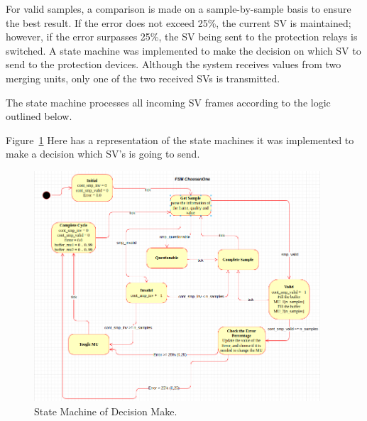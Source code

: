 For valid samples, a comparison is made on a sample-by-sample basis to ensure the best result. If the error does not exceed 25\%, the current SV is maintained; however, if the error surpasses 25\%, the SV being sent to the protection relays is switched. A state machine was implemented to make the decision on which SV to send to the protection devices. Although the system receives values from two merging units, only one of the two received SVs is transmitted.

The state machine processes all incoming SV frames according to the logic outlined below.

Figure~\ref{fig:state_machine} Here has a representation of the state machines it was implemented to make a decision which SV's is going to send. 

\begin{figure}[tbh]
	\centering
	\includegraphics[width=0.95\textwidth, keepaspectratio]{ch4/assets/state_machine.png} %
	\caption{State Machine of Decision Make.}
	\label{fig:state_machine}
\end{figure}
\FloatBarrier

